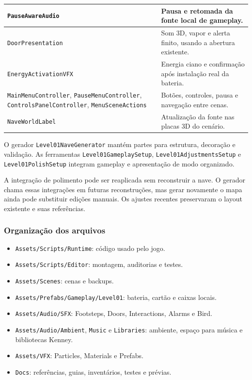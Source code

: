 \documentclass[12pt,a4paper]{article}
\begin{document}
\begin{longtable}{|p{6.3cm}|p{8.7cm}|}
\texttt{PauseAwareAudio} & Pausa e retomada da fonte local de gameplay.\\
\hline
\texttt{DoorPresentation} & Som 3D, vapor e alerta finito, usando a abertura existente.\\
\hline
\texttt{EnergyActivationVFX} & Energia ciano e confirmação após instalação real da bateria.\\
\hline
\texttt{MainMenuController}, \texttt{PauseMenuController}, \texttt{ControlsPanelController}, \texttt{MenuSceneActions}
& Botões, controles, pausa e navegação entre cenas.\\
\hline
\texttt{NaveWorldLabel} & Atualização da fonte nas placas 3D do cenário.\\
\hline
\end{longtable}
\normalsize

O gerador \texttt{Level01NaveGenerator} mantém partes para estrutura,
decoração e validação. As ferramentas \texttt{Level01GameplaySetup},
\texttt{Level01AdjustmentsSetup} e \texttt{Level01PolishSetup}
integram gameplay e apresentação de modo organizado.

A integração de polimento pode ser reaplicada sem reconstruir a
nave. O gerador chama essas integrações em futuras reconstruções,
mas gerar novamente o mapa ainda pode substituir edições manuais.
Os ajustes recentes preservaram o layout existente e suas referências.

\subsubsection*{Organização dos arquivos}

\begin{itemize}
\item \texttt{Assets/Scripts/Runtime}: código usado pelo jogo.
\item \texttt{Assets/Scripts/Editor}: montagem, auditorias e testes.
\item \texttt{Assets/Scenes}: cenas e backups.
\item \texttt{Assets/Prefabs/Gameplay/Level01}: bateria, cartão e caixas locais.
\item \texttt{Assets/Audio/SFX}: Footsteps, Doors, Interactions, Alarms e Bird.
\item \texttt{Assets/Audio/Ambient}, \texttt{Music} e \texttt{Libraries}: ambiente, espaço para música e bibliotecas Kenney.
\item \texttt{Assets/VFX}: Particles, Materials e Prefabs.
\item \texttt{Docs}: referências, guias, inventários, testes e prévias.
\end{itemize}
\end{document}
